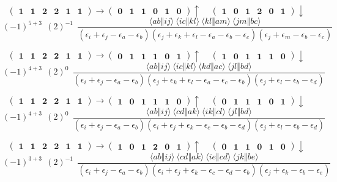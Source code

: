 \documentclass[12pt,oneside,a4paper,fleqn]{article}
\begin{document}
\[ \boldsymbol{ \begin{pmatrix} 1 & 1 & 2 & 2 & 1 & 1 \end{pmatrix} \rightarrow \begin{pmatrix} 0 & 1 & 1 & 0 & 1 & 0 \end{pmatrix} \uparrow~~~~~\begin{pmatrix} 1 & 0 & 1 & 2 & 0 & 1 \end{pmatrix} \downarrow } \]
$$(-1)^{5+3}~~(2)^{-1}~~\frac{\langle ab \Vert ij \rangle ~\langle ic \Vert kl \rangle ~\langle kl \Vert am \rangle ~\langle jm \Vert bc \rangle }{(\epsilon_i +\epsilon_j -\epsilon_a -\epsilon_b ) (\epsilon_j +\epsilon_k +\epsilon_l -\epsilon_a -\epsilon_b -\epsilon_c ) (\epsilon_j +\epsilon_m -\epsilon_b -\epsilon_c ) }$$

\[ \boldsymbol{ \begin{pmatrix} 1 & 1 & 2 & 2 & 1 & 1 \end{pmatrix} \rightarrow \begin{pmatrix} 0 & 1 & 1 & 1 & 0 & 1 \end{pmatrix} \uparrow~~~~~\begin{pmatrix} 1 & 0 & 1 & 1 & 1 & 0 \end{pmatrix} \downarrow } \]
$$(-1)^{4+3}~~(2)^{0}~~\frac{\langle ab \Vert ij \rangle ~\langle ic \Vert kl \rangle ~\langle kd \Vert ac \rangle ~\langle jl \Vert bd \rangle }{(\epsilon_i +\epsilon_j -\epsilon_a -\epsilon_b ) (\epsilon_j +\epsilon_k +\epsilon_l -\epsilon_a -\epsilon_c -\epsilon_b ) (\epsilon_j +\epsilon_l -\epsilon_b -\epsilon_d ) }$$

\[ \boldsymbol{ \begin{pmatrix} 1 & 1 & 2 & 2 & 1 & 1 \end{pmatrix} \rightarrow \begin{pmatrix} 1 & 0 & 1 & 1 & 1 & 0 \end{pmatrix} \uparrow~~~~~\begin{pmatrix} 0 & 1 & 1 & 1 & 0 & 1 \end{pmatrix} \downarrow } \]
$$(-1)^{4+3}~~(2)^{0}~~\frac{\langle ab \Vert ij \rangle ~\langle cd \Vert ak \rangle ~\langle ik \Vert cl \rangle ~\langle jl \Vert bd \rangle }{(\epsilon_i +\epsilon_j -\epsilon_a -\epsilon_b ) (\epsilon_i +\epsilon_j +\epsilon_k -\epsilon_c -\epsilon_b -\epsilon_d ) (\epsilon_j +\epsilon_l -\epsilon_b -\epsilon_d ) }$$

\[ \boldsymbol{ \begin{pmatrix} 1 & 1 & 2 & 2 & 1 & 1 \end{pmatrix} \rightarrow \begin{pmatrix} 1 & 0 & 1 & 2 & 0 & 1 \end{pmatrix} \uparrow~~~~~\begin{pmatrix} 0 & 1 & 1 & 0 & 1 & 0 \end{pmatrix} \downarrow } \]
$$(-1)^{3+3}~~(2)^{-1}~~\frac{\langle ab \Vert ij \rangle ~\langle cd \Vert ak \rangle ~\langle ie \Vert cd \rangle ~\langle jk \Vert be \rangle }{(\epsilon_i +\epsilon_j -\epsilon_a -\epsilon_b ) (\epsilon_i +\epsilon_j +\epsilon_k -\epsilon_c -\epsilon_d -\epsilon_b ) (\epsilon_j +\epsilon_k -\epsilon_b -\epsilon_e ) }$$
\end{document}
